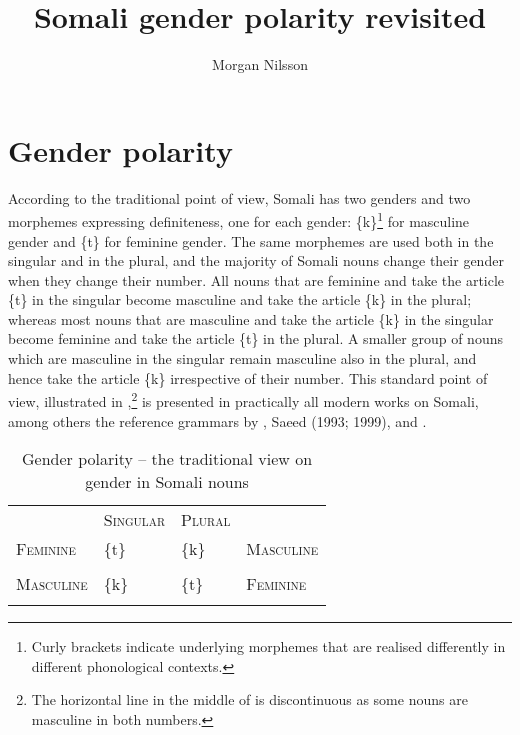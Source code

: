 \documentclass[output=paper]{langsci/langscibook}
\title{Somali gender polarity revisited}
\author{%
 Morgan Nilsson \affiliation{University of Gothenburg }
}
\begin{document}
 

 

\section{Gender polarity}

According to the traditional point of view, Somali has two genders and two morphemes expressing definiteness, one for each gender: \{k\}\footnote{Curly brackets indicate underlying morphemes that are realised differently in different phonological contexts.} for masculine gender and \{t\} for feminine gender. The same morphemes are used both in the singular and in the plural, and the majority of Somali nouns change their gender when they change their number. All nouns that are feminine and take the article \{t\} in the singular become masculine and take the article \{k\} in the plural; whereas most nouns that are masculine and take the article \{k\} in the singular become feminine and take the article \{t\} in the plural. A smaller group of nouns which are masculine in the singular remain masculine also in the plural, and hence take the article \{k\} irrespective of their number. This standard point of view, illustrated in ,\footnote{The horizontal line in the middle of  is discontinuous as some nouns are masculine in both numbers.
} is presented in practically all modern works on Somali, among others the reference grammars by \citet{Moreno1955}, Saeed (1993; 1999), \citet{PuglielliMansuur1999} and \citet{Berchem2012}.
 
\begin{table}
\caption{Gender polarity – the traditional view on gender in Somali nouns}
\label{tab:1}

\begin{tabularx}{\textwidth}{XXXX} & \textsc{Singular}& \textsc{Plural}& \\
\lsptoprule
 \textsc{Feminine}& \{t\}& \{k\}& \textsc{Masculine}\par\\
\hhline{--~~} &  &  & \\
\hhline{~~--}
 \textsc{Masculine}& \{k\}& \{t\}& \textsc{Feminine}\par\\
\lspbottomrule
\end{tabularx}

\end{table} 
\end{document}
